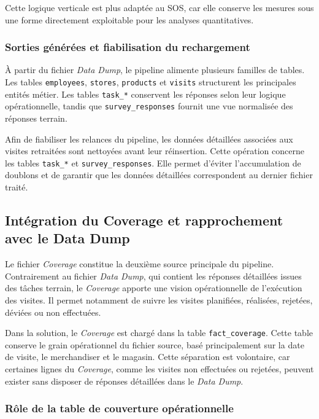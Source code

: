 Cette logique verticale est plus adaptée au SOS, car elle conserve les mesures sous une forme directement exploitable pour les analyses quantitatives.

\subsubsection{Sorties générées et fiabilisation du rechargement}

À partir du fichier \textit{Data Dump}, le pipeline alimente plusieurs familles de tables. Les tables \texttt{employees}, \texttt{stores}, \texttt{products} et \texttt{visits} structurent les principales entités métier. Les tables \texttt{task\_*} conservent les réponses selon leur logique opérationnelle, tandis que \texttt{survey\_responses} fournit une vue normalisée des réponses terrain.

Afin de fiabiliser les relances du pipeline, les données détaillées associées aux visites retraitées sont nettoyées avant leur réinsertion. Cette opération concerne les tables \texttt{task\_*} et \texttt{survey\_responses}. Elle permet d’éviter l’accumulation de doublons et de garantir que les données détaillées correspondent au dernier fichier traité.

\subsection{Intégration du Coverage et rapprochement avec le Data Dump}

Le fichier \textit{Coverage} constitue la deuxième source principale du pipeline. Contrairement au fichier \textit{Data Dump}, qui contient les réponses détaillées issues des tâches terrain, le \textit{Coverage} apporte une vision opérationnelle de l’exécution des visites. Il permet notamment de suivre les visites planifiées, réalisées, rejetées, déviées ou non effectuées.

Dans la solution, le \textit{Coverage} est chargé dans la table \texttt{fact\_coverage}. Cette table conserve le grain opérationnel du fichier source, basé principalement sur la date de visite, le merchandiser et le magasin. Cette séparation est volontaire, car certaines lignes du \textit{Coverage}, comme les visites non effectuées ou rejetées, peuvent exister sans disposer de réponses détaillées dans le \textit{Data Dump}.

\subsubsection{Rôle de la table de couverture opérationnelle}

